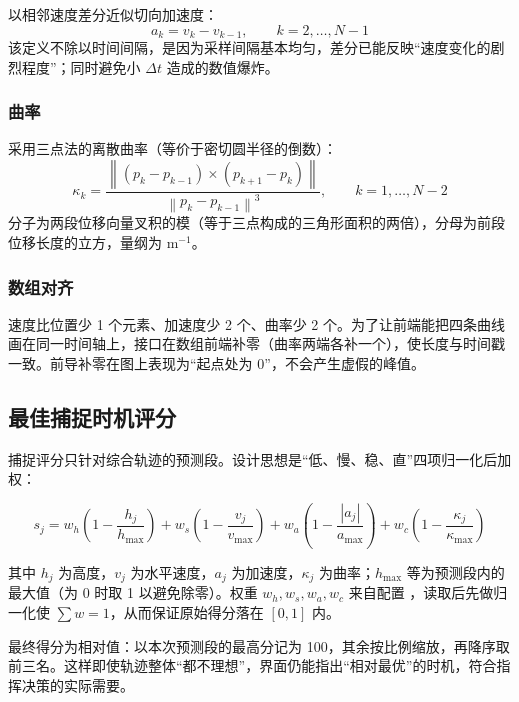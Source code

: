 以相邻速度差分近似切向加速度：
\begin{equation}
a_k=v_k-v_{k-1},\qquad k=2,\dots,N-1
\end{equation}
该定义不除以时间间隔，是因为采样间隔基本均匀，差分已能反映“速度变化的剧烈程度”；同时避免小 $\Delta t$ 造成的数值爆炸。

\subsubsection{曲率}

采用三点法的离散曲率（等价于密切圆半径的倒数）：
\begin{equation}
\kappa_k=\frac{\left\|\left(p_k-p_{k-1}\right)\times\left(p_{k+1}-p_k\right)\right\|}
{\left\|p_k-p_{k-1}\right\|^3},\qquad k=1,\dots,N-2
\end{equation}
分子为两段位移向量叉积的模（等于三点构成的三角形面积的两倍），分母为前段位移长度的立方，量纲为 $\mathrm{m^{-1}}$。

\subsubsection{数组对齐}

速度比位置少 1 个元素、加速度少 2 个、曲率少 2 个。为了让前端能把四条曲线画在同一时间轴上，接口在数组前端补零（曲率两端各补一个），使长度与时间戳一致。前导补零在图上表现为“起点处为 0”，不会产生虚假的峰值。

\subsection{最佳捕捉时机评分}

捕捉评分只针对综合轨迹的预测段。设计思想是“低、慢、稳、直”四项归一化后加权：

\begin{equation}
s_j=w_h\left(1-\frac{h_j}{h_{\max}}\right)
   +w_s\left(1-\frac{v_j}{v_{\max}}\right)
   +w_a\left(1-\frac{|a_j|}{a_{\max}}\right)
   +w_c\left(1-\frac{\kappa_j}{\kappa_{\max}}\right)
\end{equation}

其中 $h_j$ 为高度，$v_j$ 为水平速度，$a_j$ 为加速度，$\kappa_j$ 为曲率；$h_{\max}$ 等为预测段内的最大值（为 0 时取 1 以避免除零）。权重 $w_h,w_s,w_a,w_c$ 来自配置 ，读取后先做归一化使 $\sum w=1$，从而保证原始得分落在 $[0,1]$ 内。

最终得分为相对值：以本次预测段的最高分记为 100，其余按比例缩放，再降序取前三名。这样即使轨迹整体“都不理想”，界面仍能指出“相对最优”的时机，符合指挥决策的实际需要。

